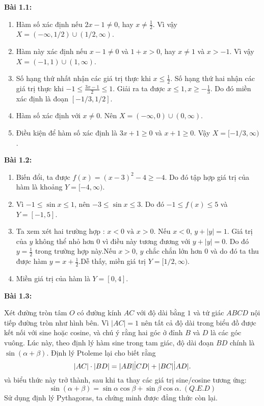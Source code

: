 \textbf{Bài 1.1:}
\begin{enumerate}[label=(\alph*)]
    \item Hàm số xác định nếu \(2x-1\neq 0\), hay \(x\neq \frac{1}{2}\). Vì vậy \(X=(-\infty, 1/2)\cup (1/2,\infty)\).
    \item Hàm này xác định nếu \(x-1\neq 0\) và \(1+x>0\), hay \(x\neq 1\) và \(x>-1\). Vì vậy \(X=(-1,1)\cup (1,\infty)\).
    \item Số hạng thứ nhất nhận các giá trị thực khi \(x\leq\frac{1}{2}\). Số hạng thứ hai nhận các giá trị thực khi \(-1\leq\frac{3x-1}{2}\leq 1.\) Giải ra ta được \(x\leq 1, x\geq -\frac{1}{3}\). Do đó miền xác định là đoạn \([-1/3,1/2]\).
    \item Hàm số xác định với \(x\neq 0\). Nên \(X=(-\infty, 0)\cup(0,\infty)\).
    \item Điều kiện để hàm số xác định là \(3x+1\geq 0\) và \(x+1\geq 0\). Vậy \(X=[-1/3,\infty)\).
\end{enumerate}
\vspace{5pt}

\textbf{Bài 1.2:}
\begin{enumerate}[label=(\alph*)]
    \item Biến đổi, ta được \(f(x)=(x-3)^2 -4 \geq -4\). Do đó tập hợp giá trị của hàm là khoảng \(Y=[-4, \infty)\).
    \item Vì \(-1\leq \sin x\leq 1\), nên \(-3\leq\sin x\leq 3\). Do đó \(-1\leq f(x)\leq 5\) và \(Y=[-1, 5]\).
    \item Ta xem xét hai trường hợp : \(x<0 \text{ và } x>0\). \newline Nếu \(x<0\), \(y+\lvert y\rvert =1\). Giá trị của \(y\) không thể nhỏ hơn \(0\) vì điều này tương đương với \(y+\lvert y\rvert =0\). Do đó \(y=\frac{1}{2}\) trong trường hợp này.\newline Nếu \(x>0\), \(y\) chắc chắn lớn hơn \(0\) và do đó ta thu được hàm \(y=x+\frac{1}{2}\).\newline Dễ thấy, miền giá trị \(Y=[1/2,\infty)\).
    \item Miền giá trị của hàm là \(Y=[0,4]\).
\end{enumerate}
\vspace{5pt}

\textbf{Bài 1.3:}

Xét đường tròn tâm \(O\) có đường kính \(AC\) với độ dài bằng \(1\) và tứ giác \(ABCD\) nội tiếp đường tròn như hình bên.\newline
Vì \(\lvert AC\rvert =1\) nên tất cả độ dài trong biểu đồ được kết nối với sine hoặc cosine, và chú ý rằng hai góc ở đỉnh \(B\) và \(D\) là các góc vuông.\newline
Lúc này, theo định lý hàm sine trong tam giác, độ dài đoạn \(BD\) chính là \(\sin(\alpha+\beta)\). Định lý Ptoleme lại cho biết rằng \[\lvert AC\rvert \cdot\lvert BD\rvert =\lvert AB\rvert\dot\lvert CD\rvert +\lvert BC\rvert\dot\lvert AD\rvert.\]
và biểu thức này trở thành, sau khi ta thay các giá trị sine/cosine tương ứng:\[\sin(\alpha+\beta)=\sin\alpha\cos\beta +\sin\beta\cos\alpha.~(Q.E.D)\]
Sử dụng định lý Pythagoras, ta chứng minh được đẳng thức còn lại.

